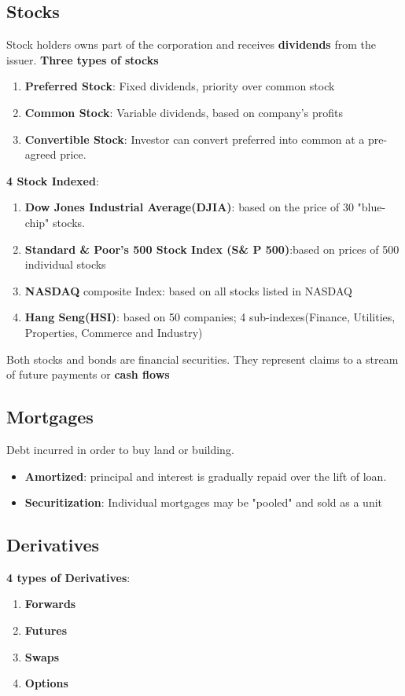 \documentclass{article}
\theoremstyle{definition}
\theoremstyle{thrm}
\theoremstyle{lma}
\theoremstyle{ppst}
\theoremstyle{crlr}
\begin{document}
\subsection{Stocks}
Stock holders owns part of the corporation and receives \textbf{dividends} from the issuer. 
\textbf{Three types of stocks}
\begin{enumerate}
	\item \textbf{Preferred Stock}: Fixed dividends, priority over common stock
	\item \textbf{Common Stock}: Variable dividends, based on company's profits
	\item \textbf{Convertible Stock}: Investor can convert preferred into common at a pre-agreed price. 
\end{enumerate}
\textbf{4 Stock Indexed}:
\begin{enumerate}
	\item \textbf{Dow Jones Industrial Average(DJIA)}: based on the price of 30 "blue-chip" stocks.
	\item \textbf{Standard \& Poor's 500 Stock Index (S\& P 500)}:based on prices of 500 individual stocks
	\item \textbf{NASDAQ} composite Index: based on all stocks listed in NASDAQ
	\item \textbf{Hang Seng(HSI)}: based on 50 companies; 4 sub-indexes(Finance, Utilities, Properties, Commerce and Industry)
\end{enumerate}
Both stocks and bonds are financial securities. They represent claims to a stream of future payments or \textbf{cash flows}
\subsection{Mortgages}
Debt incurred in order to buy land or building. 
\begin{itemize}
	\item \textbf{Amortized}: principal and interest is gradually repaid over the lift of loan. 
	\item \textbf{Securitization}: Individual mortgages may be "pooled" and sold as a unit
\end{itemize}
\subsection{Derivatives}
\textbf{4 types of Derivatives}:
\begin{enumerate}
	\item \textbf{Forwards}
	\item \textbf{Futures}
	\item \textbf{Swaps}
	\item \textbf{Options}
\end{enumerate}
\end{document}
